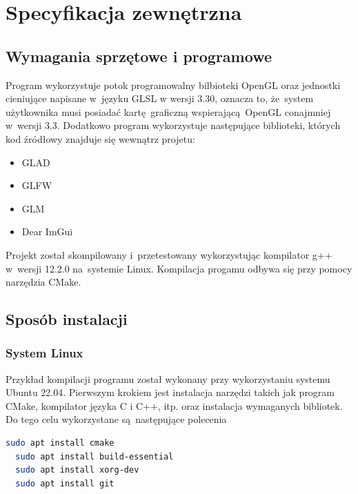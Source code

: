 \chapter{Specyfikacja zewnętrzna}
\label{ch:04}

\section{Wymagania sprzętowe i programowe}

Program wykorzystuje potok programowalny bilbioteki OpenGL oraz jednostki cieniujące napisane w~języku GLSL w wersji 3.30, oznacza to, że~system użytkownika musi posiadać kartę graficzną wspierającą OpenGL conajmniej w~wersji 3.3.
Dodatkowo program wykorzystuje następujące biblioteki, których kod źródłowy znajduje się wewnątrz projetu:
\begin{itemize}
\item GLAD
\item GLFW
\item GLM
\item Dear ImGui
\end{itemize}

Projekt został skompilowany i~przetestowany wykorzystując kompilator g++
w~wersji 12.2.0 na~systemie Linux. Kompilacja progamu odbywa się przy pomocy narzędzia CMake.

\section{Sposób instalacji}
\subsection{System Linux}
Przykład kompilacji programu został wykonany przy wykorzystaniu systemu Ubuntu 22.04. Pierwszym krokiem jest instalacja narzędzi takich jak program CMake, kompilator języka C i C++, itp. oraz instalacja wymaganych bibliotek.
Do tego celu wykorzystane są następujące polecenia
\lstset{basicstyle=\ttfamily, language=bash}
\begin{lstlisting}[language=bash]
  sudo apt install cmake
  sudo apt install build-essential
  sudo apt install xorg-dev
  sudo apt install git
\end{lstlisting}


